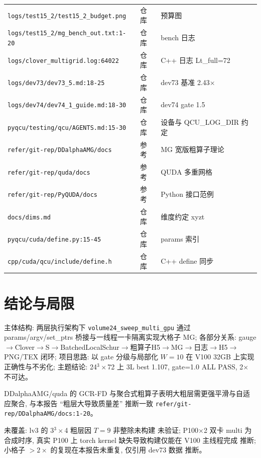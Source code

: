 \documentclass[UTF8]{ctexart}
\begin{document}
\begin{xltabular}{\textwidth}{llX}
\texttt{\nolinkurl{logs/test15_2/test15_2_budget.png}} & 仓库 & 预算图 \\
\texttt{\nolinkurl{logs/test15_2/mg_bench_out.txt:1-20}} & 仓库 & bench 日志 \\
\texttt{\nolinkurl{logs/clover_multigrid.log:64022}} & 仓库 & C++ 日志 Lt\_full=72 \\
\texttt{\nolinkurl{logs/dev73/dev73_5.md:18-25}} & 仓库 & dev73 基准 2.43$\times$ \\
\texttt{\nolinkurl{logs/dev74/dev74_1_guide.md:18-30}} & 仓库 & dev74 gate 1.5 \\
\texttt{\nolinkurl{pyqcu/testing/qcu/AGENTS.md:15-30}} & 仓库 & 设备与 QCU\_LOG\_DIR 约定 \\
\texttt{\nolinkurl{refer/git-rep/DDalphaAMG/docs}} & 参考 & MG 宽版粗算子理论 \\
\texttt{\nolinkurl{refer/git-rep/quda/docs}} & 参考 & QUDA 多重网格 \\
\texttt{\nolinkurl{refer/git-rep/PyQUDA/docs}} & 参考 & Python 接口范例 \\
\texttt{\nolinkurl{docs/dims.md}} & 仓库 & 维度约定 xyzt \\
\texttt{\nolinkurl{pyqcu/cuda/define.py:15-45}} & 仓库 & params 索引 \\
\texttt{\nolinkurl{cpp/cuda/qcu/include/define.h}} & 仓库 & C++ define 同步 \\
\bottomrule
\end{xltabular}

\section{结论与局限}
\begin{conclbox}
主体结构: 两层执行架构下 \texttt{\nolinkurl{volume24_sweep_multi_gpu}} 通过 params/argv/set\_ptrs 桥接与一线程一卡隔离实现大格子 MG; 各部分关系: gauge$\to$Clover$\to$S$\to$BatchedLocalSchur$\to$粗算子H5$\to$MG$\to$日志$\to$H5$\to$PNG/TEX 闭环; 项目思路: 以 gate 分级与局部化 $W=10$ 在 V100 32GB 上实现正确性与不劣化; 主题结论: 24$^3\times$72 上 3L best 1.107, gate=1.0 ALL PASS, 2$\times$ 不可达。
\end{conclbox}
\begin{refbox}
DDalphaAMG/quda 的 GCR-FD 与聚合式粗算子表明大粗层需更强平滑与自适应聚合, 与本报告 ``粗层大导致质量差'' 推断一致 \textcolor{evidence}{\texttt{\nolinkurl{refer/git-rep/DDalphaAMG/docs:1-20}}}。
\end{refbox}
\begin{warnbox}
未覆盖: lv3 的 3$^3\times$4 粗层因 $T=9$ 非整除未构建 \textcolor{warn}{未验证}; P100$\times$2 双卡 multi 为合成时序, 真实 P100 上 torch kernel 缺失导致构建仅能在 V100 主线程完成 \textcolor{warn}{推断}; 小格子 $>2\times$ 的复现在本报告未重复, 仅引用 dev73 数据 \textcolor{warn}{推断}。
\end{warnbox}
\end{document}
